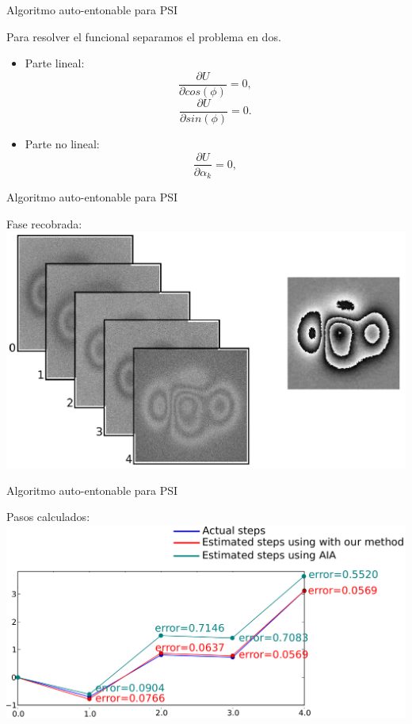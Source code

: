 \documentclass[]{beamer}
\begin{document}
\begin{frame}{Algoritmo auto-entonable para PSI}

Para resolver el funcional separamos el problema en dos.
\begin{itemize}
  
  \pause \item Parte lineal: \\
  \begin{equation}  
    \frac{\partial U}{\partial cos(\phi) }=0,
  \end{equation}
  \begin{equation}  
    \frac{\partial U}{\partial sin(\phi) }=0.
  \end{equation}
  
  \pause \item Parte no lineal:\\
  \begin{equation}  
    \frac{\partial U}{\partial \alpha_k }=0,
  \end{equation}

\end{itemize}

\end{frame}
\begin{frame}{Algoritmo auto-entonable para PSI}

Fase recobrada:
\includegraphics[scale=0.25]{Images/FaseSelfTuning.png}

\end{frame}
\begin{frame}{Algoritmo auto-entonable para PSI}

Pasos calculados:
\includegraphics[scale=0.25]{Images/Self-tuningGraphError.png}

\end{frame}
\end{document}
